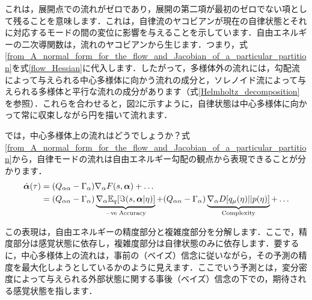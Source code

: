 \documentclass[a4paper, titlepage]{jsarticle}
\begin{document}
これは，展開点での流れがゼロであり，展開の第二項が最初のゼロでない項として残ることを意味します．これは，自律流のヤコビアンが現在の自律状態とそれに対応するモードの間の変位に影響を与えることを示しています．自由エネルギーの二次導関数は，流れのヤコビアンから生じます．つまり，式\eqref{from_A_normal_form_for_the_flow_and_Jacobian_of_a_particular_partition}を式\eqref{flow_Hessian}に代入します．したがって，多様体外の流れには，勾配流によって与えられる中心多様体に向かう流れの成分と，ソレノイド流によって与えられる多様体と平行な流れの成分があります（式\eqref{Helmholtz_decomposition}を参照）．これらを合わせると，図2に示すように，自律状態は中心多様体に向かって常に収束しながら円を描いて流れます．
\par
では，中心多様体上の流れはどうでしょうか？式\eqref{from_A_normal_form_for_the_flow_and_Jacobian_of_a_particular_partition}から，自律モードの流れは自由エネルギー勾配の観点から表現できることが分かります．
\begin{equation}
    \begin{aligned}
        \dot{\bm{\alpha}}(\tau) &= (Q_{\alpha\alpha} - \Gamma_{\alpha}) \nabla_\alpha F(s, \bm{\alpha}) + \dots \\
        &= (Q_{\alpha\alpha} - \Gamma_{\alpha}) \underbrace{\nabla_\alpha\mathbb{E}_q[\imaginary(s, \bm{\alpha}| \eta)]}_{\mathrm{-ve\;Accuracy}} + (Q_{\alpha\alpha} - \Gamma_{\alpha})\underbrace{\nabla_\alpha D[q_{\mu}(\eta) || p(\eta)]}_{\mathrm{Complexity}} + \dots
    \end{aligned}
\end{equation}
\par
この表現は，自由エネルギーの精度部分と複雑度部分を分解します．ここで，精度部分は感覚状態に依存し，複雑度部分は自律状態のみに依存します．要するに，中心多様体上の流れは，事前の（ベイズ）信念に従いながら，その予測の精度を最大化しようとしているかのように見えます．ここでいう予測とは，変分密度によって与えられる外部状態に関する事後（ベイズ）信念の下での，期待される感覚状態を指します．
\end{document}

